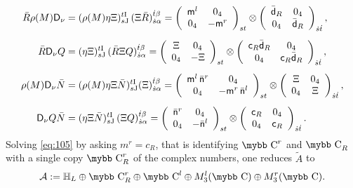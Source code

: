 \documentclass[11pt]{article}
\newcommand{\A}{\mathcal A}
\def\bb#1{\hbox{\mybb#1}}
\newcommand{\sI}{\mathrm  I}
\newcommand{\sJ}{\mathrm J}
\newcommand{\sD}{\mathsf D}
\begin{document}
\begin{align}
\bar{R}\rho(M)\sf D_{\nu} & =(\rho(M)\eta\Xi)_{s\sJ}^{t\sI}\,(\Xi\bar{R})_{\dot{s}\alpha}^{\dot{t}\beta}=\left(\begin{array}{cc}
{\sf m}^l & 0_{4}\\
0_{4} & -{\sf m}^r
\end{array}\right)_{st}\otimes\left(\begin{array}{cc}
\bar{\sf d}_{R} & 0_{4}\\
0_{4} & \bar{\sf d}_{R}
\end{array}\right)_{\dot{s}\dot{t}},\label{eq:102bisbis}\\[5pt]
\bar{R}\sD_{\nu}Q & =(\eta\Xi)_{s\sJ}^{t\sI}\,(\bar R\Xi Q)_{\dot{s}\alpha}^{\dot{t}\beta}=\left(\begin{array}{cc}
\Xi & 0_{4}\\
0_{4} & -\Xi
\end{array}\right)_{st}\otimes\left(\begin{array}{cc}
{\sf c}_R\bar{\sf d}_R & 0_{4}\\
0_{4} & {\sf c}_R\bar{\sf d}_R
\end{array}\right)_{\dot{s}\dot{t}},\\[5pt]
\rho(M)\sD_{\nu}\bar{N} & =(\rho(M)\eta\Xi\bar{N})_{s\sJ}^{t\sI}(\Xi)_{\dot{s}\alpha}^{\dot{t}\beta}=\left(\begin{array}{cc}
 {\sf m}^l \,\bar{\sf n}^r& 0_{4}\\
0_{4} & -{\sf m}^r\,\bar{\sf n}^l
\end{array}\right)_{st}\otimes\left(\begin{array}{cc}
\Xi & 0_{4}\\
0_{4} & \Xi
\end{array}\right)_{\dot{s}\dot{t}},\\[5pt]
\sD_{\nu} Q\bar{N} & =(\eta\Xi \bar{N})_{s\sJ}^{t\sI}\,(\Xi Q)_{\dot{s}\alpha}^{\dot{t}\beta}=\left(\begin{array}{cc}
\bar{\sf n}^r & 0_{4}\\
0_{4} & -\bar{\sf n}^l
\end{array}\right)_{st}\otimes\left(\begin{array}{cc}
{\sf c}_{R} & 0_{4}\\
0_{4} & {\sf c}_{R}
\end{array}\right)_{\dot{s}\dot{t}}.
\end{align}
 Solving \eqref{eq:105} by
asking $m^r = c_R$, that is identifying $\bb C^{r}$ and  $\bb C_R$
with a single copy $\bb C_R^r$ of the complex numbers, one reduces
$\tilde A$ to 
\begin{equation}
  \label{eq:54}
  \A:= \mathbb H_L \oplus \bb C^r_R \oplus \bb C^l\oplus M_3^l(\bb C) \oplus
  M_3^r(\bb C). 
\end{equation}
\end{document}
